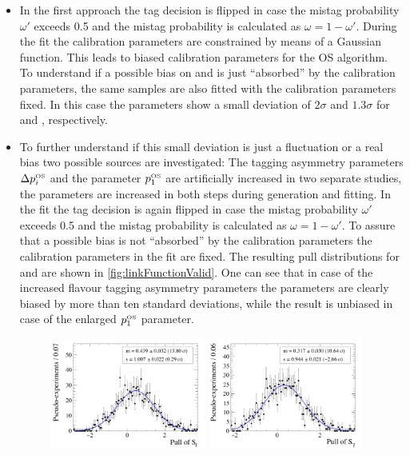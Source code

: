\begin{itemize}
	\item In the first approach the tag decision is flipped in case the mistag probability $\omega'$ exceeds \num{0.5} and the mistag probability is calculated as $\omega=1-\omega'$.
	During the fit the calibration parameters are constrained by means of a Gaussian function. This leads to biased calibration parameters for the OS algorithm.
	To understand if a possible bias on \Sf and \Sfbar is just \enquote{absorbed} by the calibration parameters, the same samples are also fitted with the calibration parameters fixed.
	In this case the \CP parameters show a small deviation of $2\sigma$ and $1.3\sigma$ for \Sf and \Sfbar, respectively.
	\item To further understand if this small deviation is just a fluctuation or a real bias two possible sources are investigated:
	The tagging asymmetry parameters $\Delta p_i^{\text{\tiny OS}}$ and the parameter $p_1^{\text{\tiny OS}}$ are artificially increased in two separate studies, \ie the parameters are increased in both steps during generation and fitting.
	In the fit the tag decision is again flipped in case the mistag probability $\omega'$ exceeds \num{0.5} and the mistag probability is calculated as $\omega=1-\omega'$.
	To assure that a possible bias is not \enquote{absorbed} by the calibration parameters the calibration parameters in the fit are fixed.
	The resulting pull distributions for \Sf and \Sfbar are shown in \cref{fig:linkFunctionValid}.
	One can see that in case of the increased flavour tagging asymmetry parameters the \CP parameters are clearly biased by more than ten standard deviations, while the result is unbiased in case of the enlarged $p_1^{\text{\tiny OS}}$ parameter.
	\begin{figure}[tbp]
    \centering
    	\includegraphics[width=0.48\textwidth]{09TimeFit/figs/Sf_pull_LinkValid_asym.pdf}
    	\includegraphics[width=0.48\textwidth]{09TimeFit/figs/Sfbar_pull_LinkValid_asym.pdf}\\

\end{figure}
\end{itemize}
